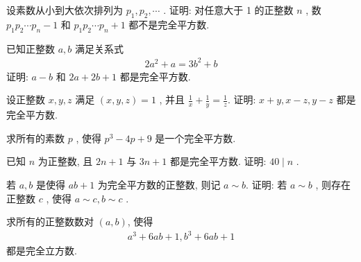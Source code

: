 \documentclass[aspectratio=169]{ctexbeamer}
\theoremstyle{definition}
\begin{document}
\begin{frame}[t]
	\begin{example}
		设素数从小到大依次排列为 $p_{1}, p_{2}, \cdots$ . 证明: 对任意大于 1 的正整数 $n$ , 数 $p_{1} p_{2} \cdots p_{n}-1$ 和 $p_{1} p_{2} \cdots p_{n}+1$ 都不是完全平方数.
	\end{example}
\end{frame}

\begin{frame}[t]
	\begin{example}
		已知正整数 $a ,  b$ 满足关系式
		\begin{align*}
			2 a^{2}+a=3 b^{2}+b
		\end{align*}
		证明: $a-b$ 和 $2 a+2 b+1$ 都是完全平方数.
	\end{example}
\end{frame}

\begin{frame}[t]
	\begin{example}
		设正整数 $x ,  y ,  z$ 满足 $(x, y, z)=1$ , 并且 $\frac{1}{x}+\frac{1}{y}=\frac{1}{z}$. 证明:  $x+y ,  x-z ,  y-z$ 都是完全平方数.
	\end{example}
\end{frame}

\begin{frame}[t]
	\begin{example}
		求所有的素数 $p$ , 使得 $p^{3}-4 p+9$ 是一个完全平方数.
	\end{example}
\end{frame}

\begin{frame}[t]
	\begin{example}
		已知 $n$ 为正整数, 且 $2 n+1$ 与 $3 n+1$ 都是完全平方数. 证明:  $40 \mid n$ .
	\end{example}
\end{frame}

\begin{frame}[t]
	\begin{example}
		若 $a ,  b$ 是使得 $a b+1$ 为完全平方数的正整数, 则记 $a \sim b$. 证明: 若 $a \sim b$ , 则存在正整数 $c$ , 使得 $a \sim c, b \sim c$ .
	\end{example}
\end{frame}

\begin{frame}[t]
	\begin{example}
		求所有的正整数数对 $(a, b)$, 使得
		\begin{align*}
			a^{3}+6 a b+1, b^{3}+6 a b+1
		\end{align*}
		都是完全立方数.
	\end{example}
\end{frame}
\end{document}
